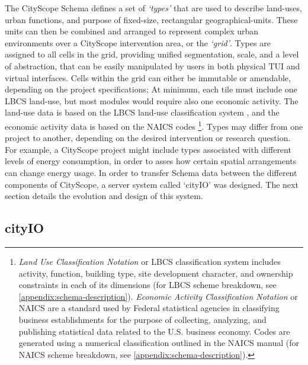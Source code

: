 {{      The CityScope Schema defines a set of \textit{`types'} that are used to describe land-uses, urban functions, and purpose of fixed-size, rectangular geographical-units. These units can then be combined and arranged to represent complex urban environments over a CityScope intervention area, or the  \textit{`grid'}. Types are assigned to all cells in the grid, providing unified segmentation, scale, and a level of abstraction, that can be easily manipulated by users in both physical TUI and virtual interfaces. Cells within the grid can either be immutable or amendable, depending on the project specifications; At minimum, each tile must include one LBCS land-use, but most modules would require also one economic activity. The land-use data is based on the LBCS land-use classification system \cite{montenegro2012land}, and the economic activity data is based on the NAICS codes \cite{NorthAme86:online}\footnote{
          \textit{Land Use Classification Notation} or LBCS classification system includes activity, function, building type, site development character, and ownership constraints in each of its dimensions (for LBCS scheme breakdown, see \eqref{appendix:schema-description}).
          \newline
          \textit{Economic Activity Classification Notation} or NAICS are a standard used by Federal statistical agencies in classifying business establishments for the purpose of collecting, analyzing, and publishing statistical data related to the U.S. business economy. Codes are generated using a numerical classification outlined in the NAICS manual \cite{NorthAme86:online} (for NAICS scheme breakdown, see \eqref{appendix:schema-description}).
      }.
      Types may differ from one project to another, depending on the desired intervention or research question. For example, a CityScope project might include types associated with different levels of energy consumption, in order to asses how certain spatial arrangements can change energy usage.
      \newline
      In order to transfer Schema data between the different components of CityScope, a server system called `cityIO' was designed. The next section details the evolution and design of this system.
  }


  \subsection{cityIO}\label{subsec:csarch-cityio}
  {

}}
